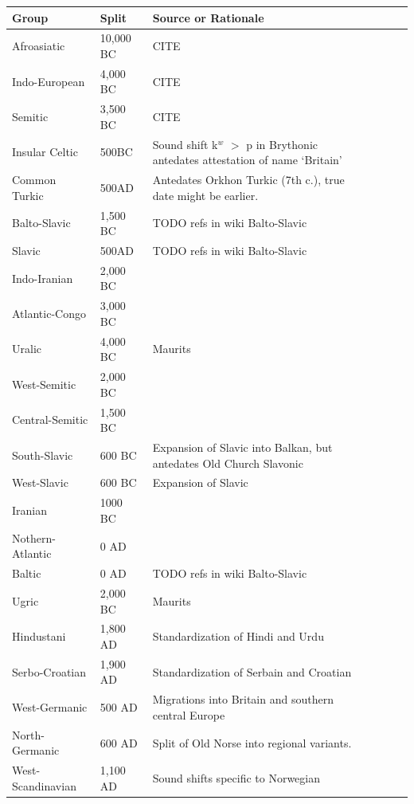 \documentclass[11pt,a4paper]{article}
\begin{document}
\begin{tabular}{lllllll}
Group & Split & Source or Rationale \\ \hline
Afroasiatic & 10,000 BC & CITE \\
Indo-European & 4,000 BC & CITE \\
Semitic & 3,500 BC & CITE \\
Insular Celtic & 500BC & Sound shift k$^w$ $>$ p in Brythonic antedates attestation of name `Britain'\\ %
Common Turkic & 500AD & Antedates Orkhon Turkic (7th c.), true date might be earlier. \\
Balto-Slavic & 1,500 BC & TODO refs in wiki Balto-Slavic \\
Slavic       & 500AD & TODO refs in wiki Balto-Slavic\\
Indo-Iranian & 2,000 BC \\ %
Atlantic-Congo & 3,000 BC \\
Uralic & 4,000 BC & Maurits \\
West-Semitic & 2,000 BC & \\
Central-Semitic & 1,500 BC & \\
South-Slavic & 600 BC & Expansion of Slavic into Balkan, but antedates Old Church Slavonic \\
West-Slavic & 600 BC & Expansion of Slavic \\
Iranian & 1000 BC \\ %
Nothern-Atlantic & 0 AD \\
Baltic & 0 AD & TODO refs in wiki Balto-Slavic\\
Ugric & 2,000 BC & Maurits \\
Hindustani & 1,800 AD & Standardization of Hindi and Urdu\\
Serbo-Croatian & 1,900 AD & Standardization of Serbain and Croatian\\
West-Germanic & 500 AD & Migrations into Britain and southern central Europe\\
North-Germanic & 600 AD & Split of Old Norse into regional variants. \\%
West-Scandinavian & 1,100 AD & Sound shifts specific to Norwegian\\

\end{tabular}
\end{document}
